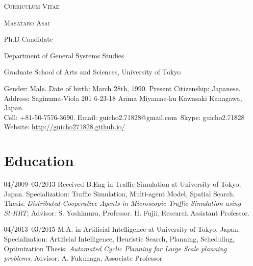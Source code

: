 \documentclass[letterpaper]{article}
\begin{document}
\pagestyle{empty}

\begin{center}
\huge{\textsc{Curriculum Vitae}}
\vspace{0.7\baselineskip}

\Large{\textsc{Masataro Asai}}
\vspace{0.5\baselineskip}

\large{
Ph.D Candidate

Department of General Systems Studies

Graduate School of Arts and Sciences, University of Tokyo
}

\vspace{0.8\baselineskip}

\normalsize{
 Gender: Male. Date of birth: March 28th, 1990. Present Citizenship: Japanese. \\
 Address: Saginuma-Viola 201 6-23-18 Arima Miyamae-ku Kawasaki Kanagawa, Japan. \\
 Cell: +81-50-7576-3690. Email: guicho2.71828@gmail.com\ Skype: guicho2.71828\\
 Website: \url{http://guicho271828.github.io/}}
\end{center}


\section{Education}

\begin{CV}
 \item[04/2009--03/2013] Received B.Eng in Traffic Simulation at University of Tokyo, Japan.
 Specialization: Traffic Simulation, Multi-agent Model, Spatial Search.
 {\small Thesis: \emph{Distributed Cooperative Agents in Microscopic
 Traffic Simulation using St-RRT}; Advisor: S. Yoshimura,
 Professor. H. Fujii, Research Assistant Professor.}

 \item[04/2013--03/2015] M.A. in Artificial Intelligence at University of Tokyo, Japan.
 Specialization: Artificial Intelligence, Heuristic Search, Planning, Scheduling, Optimization
 {\small Thesis: \emph{Automated Cyclic Planning for Large Scale planning problems};
 Advisor: A. Fukunaga, Associate Professor}
\end{CV}
\end{document}

